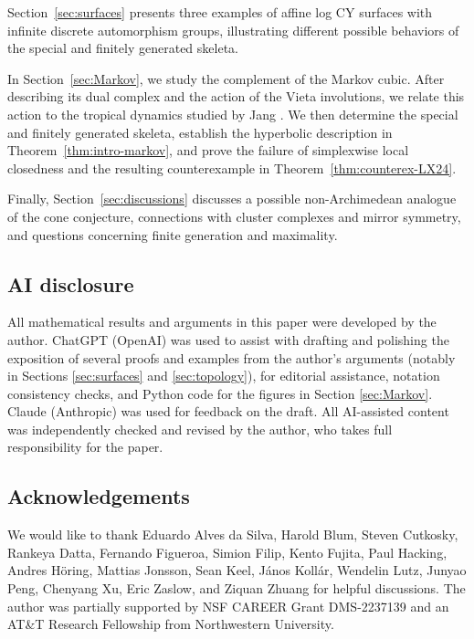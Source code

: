 \documentclass[reqno, 12pt]{amsart}
\theoremstyle{definition}
\numberwithin{equation}{section}
\begin{document}
Section~\ref{sec:surfaces} presents three examples of affine log CY surfaces
with infinite discrete automorphism groups, illustrating
different possible behaviors of the special and finitely
generated skeleta.

In Section~\ref{sec:Markov}, we study the complement of the Markov cubic.
After describing its dual complex and the action of the Vieta
involutions, we relate this action to the tropical dynamics
studied by Jang \cite{Jan23}. We then determine the special
and finitely generated skeleta, establish the hyperbolic
description in Theorem~\ref{thm:intro-markov}, and prove the failure of
simplexwise local closedness and the resulting counterexample
in Theorem~\ref{thm:counterex-LX24}.

Finally, Section~\ref{sec:discussions} discusses a possible non-Archimedean
analogue of the cone conjecture, connections with cluster
complexes and mirror symmetry, and questions concerning finite
generation and maximality.



\subsection*{AI disclosure}
All mathematical results and arguments in this paper were developed by the author. ChatGPT (OpenAI) was used to assist with drafting and polishing the exposition of several proofs and examples from the author's arguments (notably in Sections \ref{sec:surfaces} and \ref{sec:topology}), for editorial assistance, notation consistency checks, and Python code for the figures in Section \ref{sec:Markov}. Claude (Anthropic) was used for feedback on the draft. All AI-assisted content was independently checked and revised by the author, who takes full responsibility for the paper.

\subsection*{Acknowledgements} 

We would like to thank Eduardo Alves da Silva, Harold Blum, Steven Cutkosky, Rankeya Datta, Fernando Figueroa, Simion Filip, Kento Fujita, Paul Hacking, Andres H\"oring, Mattias Jonsson, Sean Keel, J\'anos Koll\'ar, Wendelin Lutz, Junyao Peng, Chenyang Xu, Eric Zaslow, and Ziquan Zhuang for helpful discussions. The author was partially supported by NSF CAREER Grant DMS-2237139 and an AT\&T Research Fellowship from Northwestern University.
\end{document}
